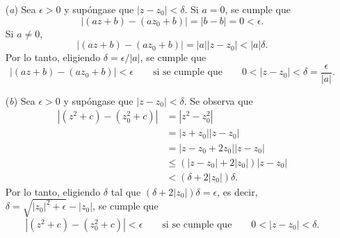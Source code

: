 \documentclass[a4paper]{report}
\begin{document}
\begin{enumerate}
 \item[(\textit{a})] Sea \(\epsilon>0\) y supóngase que \(|z-z_0|<\delta\). Si \(a=0\), se cumple que 
 \[
  |(az+b)-(az_0+b)|=|b-b|=0<\epsilon.
 \]
 Si \(a\neq0\),
 \[
  |(az+b)-(az_0+b)|=|a||z-z_0|<|a|\delta.
 \]
 Por lo tanto, eligiendo \(\delta=\epsilon/|a|\), se cumple que 
 \[
  |(az+b)-(az_0+b)|<\epsilon
  \qquad\textrm{si se cumple que}\qquad
  0<|z-z_0|<\delta=\frac{\epsilon}{|a|}.
 \]
 \item[(\textit{b})] Sea \(\epsilon>0\) y supóngase que \(|z-z_0|<\delta\). Se observa que
 \begin{align*}
  |(z^2+c)-(z_0^2+c)|&=|z^2-z_0^2|\\
   &=|z+z_0||z-z_0|\\
   &=|z-z_0+2z_0||z-z_0|\\
   &\leq(|z-z_0|+2|z_0|)|z-z_0|\\
   &<(\delta+2|z_0|)\delta.
 \end{align*}
 Por lo tanto, eligiendo \(\delta\) tal que \((\delta+2|z_0|)\delta=\epsilon\), es decir, \(\delta=\sqrt{|z_0|^2+\epsilon}-|z_0|\), se cumple que 
 \[
  |(z^2+c)-(z_0^2+c)|<\epsilon
  \qquad\textrm{si se cumple que}\qquad
  0<|z-z_0|<\delta.
 \]
 

\end{enumerate}
\end{document}
